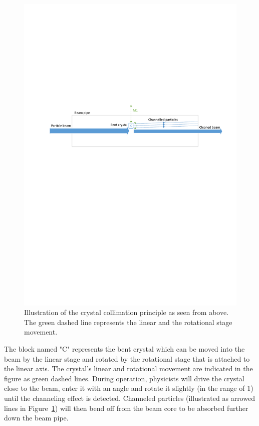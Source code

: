 \begin{figure}[h]
  \centering %
  \includegraphics[width=1\textwidth, trim= 2cm 15cm 1cm 10cm, clip=true]{fig/matlab/collimation}
  \caption{\label{fig:collimation}Illustration of the crystal collimation principle as seen from above. The green dashed line represents the linear and the rotational stage movement.}
\end{figure}

The block named "C" represents the bent crystal which can be moved into the beam by the linear stage and rotated by the rotational stage that is attached to the linear axis. The crystal's linear and rotational movement are indicated in the figure as green dashed lines. During operation, physicists will drive the crystal close to the beam, enter it with an angle and rotate it slightly (in the range of \unit{1}{\milli\rad}) until the channeling effect is detected. Channeled particles (illustrated as arrowed lines in Figure~\ref{fig:collimation}) will then bend off from the beam core to be absorbed further down the beam pipe.

